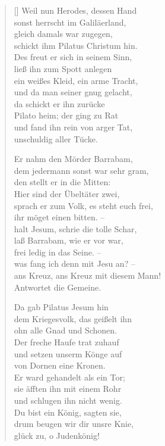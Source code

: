 \begin{multicols}{2}
\begin{verse}[\versewidth]
 Weil nun Herodes, dessen Hand\\
sonst herrscht im Galiläerland,\\
gleich damals war zugegen,\\
schickt ihm Pilatus Christum hin.\\
Des freut er sich in seinem Sinn,\\
ließ ihn zum Spott anlegen\\
ein weißes Kleid, ein arme Tracht,\\
und da man seiner gnug gelacht,\\
da schickt er ihn zurücke\\
Pilato heim; der ging zu Rat\\
und fand ihn rein von arger Tat,\\
unschuldig aller Tücke.

 Er nahm den Mörder Barrabam,\\
dem jedermann sonst war sehr gram,\\
den stellt er in die Mitten:\\
Hier sind der Übeltäter zwei,\\
sprach er zum Volk, es steht euch frei,\\
ihr möget einen bitten. –\\
halt Jesum, schrie die tolle Schar,\\
laß Barrabam, wie er vor war,\\
frei ledig in das Seine. –\\
was fang ich denn mit Jesu an? –\\
ans Kreuz, ans Kreuz mit diesem Mann!\\
Antwortet die Gemeine.

 Da gab Pilatus Jesum hin\\
dem Kriegesvolk, das geißelt ihn\\
ohn alle Gnad und Schonen.\\
Der freche Haufe trat zuhauf\\
und setzen unserm Könge auf\\
von Dornen eine Kronen.\\
Er ward gehandelt als ein Tor;\\
sie äfften ihn mit einem Rohr\\
und schlugen ihn nicht wenig.\\
Du bist ein König, sagten sie,\\
drum beugen wir dir unsre Knie,\\
glück zu, o Judenkönig!


\end{verse}
\end{multicols}
